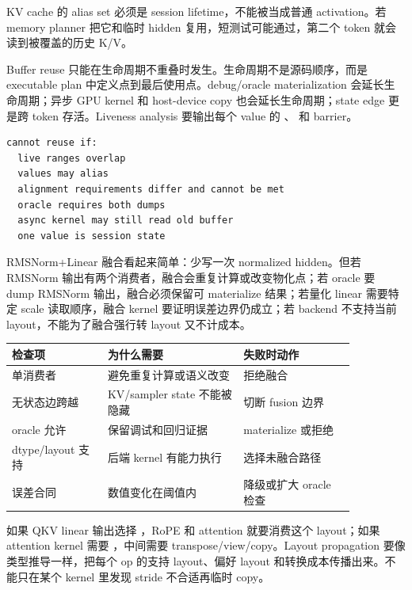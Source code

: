 KV cache 的 alias set 必须是 session lifetime，不能被当成普通 activation。若 memory planner 把它和临时 hidden 复用，短测试可能通过，第二个 token 就会读到被覆盖的历史 K/V。

Buffer reuse 只能在生命周期不重叠时发生。生命周期不是源码顺序，而是 executable plan 中定义点到最后使用点。debug/oracle materialization 会延长生命周期；异步 GPU kernel 和 host-device copy 也会延长生命周期；state edge 更是跨 token 存活。Liveness analysis 要输出每个 value 的 、 和 barrier。

\begin{lstlisting}[numbers=none,caption={buffer reuse 的拒绝条件}]
cannot reuse if:
  live ranges overlap
  values may alias
  alignment requirements differ and cannot be met
  oracle requires both dumps
  async kernel may still read old buffer
  one value is session state
\end{lstlisting}

RMSNorm+Linear 融合看起来简单：少写一次 normalized hidden。但若 RMSNorm 输出有两个消费者，融合会重复计算或改变物化点；若 oracle 要 dump RMSNorm 输出，融合必须保留可 materialize 结果；若量化 linear 需要特定 scale 读取顺序，融合 kernel 要证明误差边界仍成立；若 backend 不支持当前 layout，不能为了融合强行转 layout 又不计成本。

\begin{center}
\begin{tabular}{p{0.24\linewidth}p{0.34\linewidth}p{0.28\linewidth}}
\toprule
检查项 & 为什么需要 & 失败时动作 \\
\midrule
单消费者 & 避免重复计算或语义改变 & 拒绝融合 \\
无状态边跨越 & KV/sampler state 不能被隐藏 & 切断 fusion 边界 \\
oracle 允许 & 保留调试和回归证据 & materialize 或拒绝 \\
dtype/layout 支持 & 后端 kernel 有能力执行 & 选择未融合路径 \\
误差合同 & 数值变化在阈值内 & 降级或扩大 oracle 检查 \\
\bottomrule
\end{tabular}
\end{center}

如果 QKV linear 输出选择 ，RoPE 和 attention 就要消费这个 layout；如果 attention kernel 需要 ，中间需要 transpose/view/copy。Layout propagation 要像类型推导一样，把每个 op 的支持 layout、偏好 layout 和转换成本传播出来。不能只在某个 kernel 里发现 stride 不合适再临时 copy。

